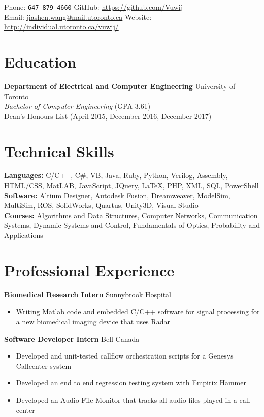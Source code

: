 \documentclass[10pt, a4paper]{cv}
\begin{document}

Phone: \texttt{647-879-4660} \hfill
GitHub: \href{https://github.com/Vuwij}{https://github.com/Vuwij}\\
Email: \href{mailto:jiashen.wang@mail.utoronto.ca}{jiashen.wang@mail.utoronto.ca}\hfill
Website: \href{http://individual.utoronto.ca/vuwij/}{http://individual.utoronto.ca/vuwij/}\\

\section*{Education}
\textbf{Department of Electrical and Computer Engineering} \hfill University of Toronto\\
\emph{Bachelor of Computer Engineering} \small{\textsc{(GPA 3.61)}}\\[0.1mm]
\small Dean's Honours List (April 2015, December 2016, December 2017)

\section*{Technical Skills}
\textbf{Languages:} C/C++, C\#, VB, Java, Ruby, Python, Verilog, Assembly, HTML/CSS, MatLAB, JavaScript, JQuery, LaTeX, PHP, XML, SQL, PowerShell\\[0.2em]
\textbf{Software:} Altium Designer, Autodesk Fusion, Dreamweaver, ModelSim, MultiSim, ROS, SolidWorks, Quartus, Unity3D, Visual Studio\\[0.2em]
\textbf{Courses:} Algorithms and Data Structures, Computer Networks, Communication Systems, Dynamic Systems and Control, Fundamentals of Optics, Probability and Applications

\section*{Professional Experience}\noindent

	\textbf{Biomedical Research Intern} \hfill Sunnybrook Hospital
	\begin{itemize}
		\item Writing Matlab code and embedded C/C++ software for signal processing for a new biomedical imaging device that uses Radar
	\end{itemize}
	
	\textbf{Software Developer Intern} \hfill Bell Canada
	\begin{itemize}
		\item Developed and unit-tested callflow orchestration scripts for a Genesys Callcenter system
		\item Developed an end to end regression testing system with Empirix Hammer
		\item Developed an Audio File Monitor that tracks all audio files played in a call center
	\end{itemize}
	
\end{document}
